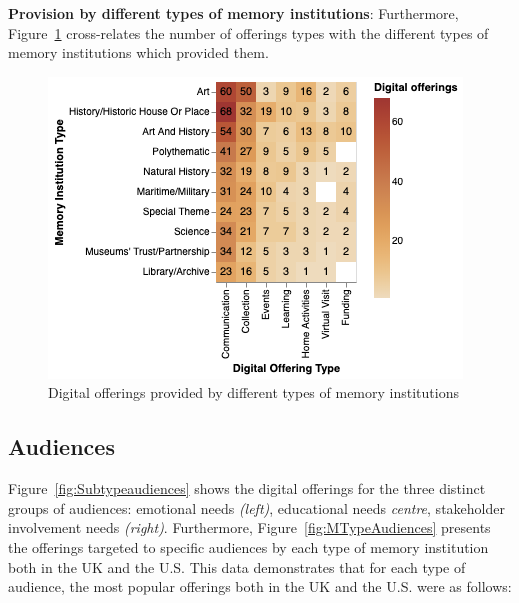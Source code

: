 \documentclass{egpubl}
\begin{document}




\noindent \textbf{Provision by different types of memory institutions}: Furthermore, Figure~\ref{fig:MTypeOfferings} cross-relates the number of offerings types with the different types of memory institutions which provided them. 

\begin{figure}[h]
  \centering
  \includegraphics[width=\linewidth]{images/museumoffering.png}
  \caption{\label{fig:MTypeOfferings}
           Digital offerings provided by different types of memory institutions}
\end{figure}






\subsection{Audiences}
\label{aud}
Figure~\ref{fig:Subtypeaudiences} shows the digital offerings for the three distinct groups of audiences: emotional needs  \emph{(left)}, educational needs \emph{centre}, stakeholder involvement needs \emph{(right)}. Furthermore, Figure~\ref{fig:MTypeAudiences} presents the offerings targeted to specific audiences by each type of memory institution both in the UK and the U.S. This data demonstrates that for each type of audience, the most popular offerings both in the UK and the U.S. were as follows:
\end{document}
